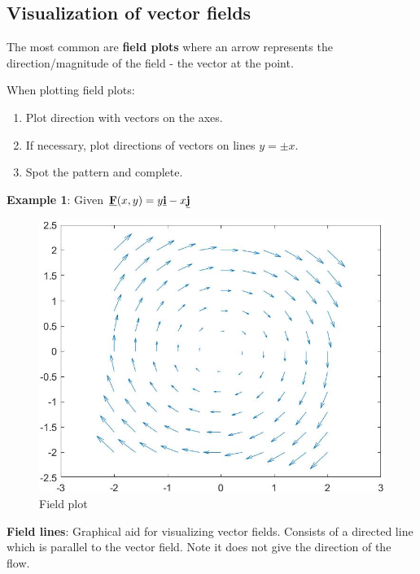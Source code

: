 \documentclass[10pt,a4paper]{article}
\begin{document}
\subsection{Visualization of vector fields}

The most common are \textbf{field plots} where an arrow represents the direction/magnitude of the
field - the vector at the point. 

When plotting field plots:
\begin{enumerate}
    \item Plot direction with vectors on the axes.
    \item If necessary, plot directions of vectors on lines $y=\pm x$.
    \item Spot the pattern and complete.
\end{enumerate}

\textbf{Example 1}: Given
$\textbf{\underline{F}}(x,y)=y\textbf{\underline{i}}-x\textbf{\underline{j}}$

\begin{figure} [h!]
    \centering
    \includegraphics[scale=0.25]{Vector field.JPG}
    \caption{Field plot}
\end{figure}

\begin{tcolorbox}[breakable,colback=white]
\textbf{Field lines}: Graphical aid for visualizing vector fields. Consists of a directed line which
is parallel to the vector field. Note it does not give the direction of the flow.
\end{tcolorbox}
\end{document}
